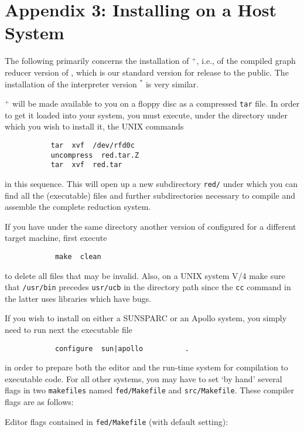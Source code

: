 \section*{Appendix 3: Installing \pired on a Host System}

The following primarily concerns the installation of \pired$^+$, i.e., of the
 compiled graph reducer version of \pired, which is our standard version for
release to the public. The installation of the interpreter
 version \pired$^*$ is very similar.

\pired$^+$ will be made available to you on a floppy disc as a compressed
 {\tt tar} file. In order to get it loaded into your system, you must
execute, under the directory under which you wish to install it, the
UNIX commands 
\begin{verbatim}
           tar  xvf  /dev/rfd0c 
           uncompress  red.tar.Z 
           tar  xvf  red.tar
\end{verbatim}
in this sequence. This will open up a new subdirectory {\tt red/} under
 which you can find all the (executable) files and further subdirectories 
necessary to compile and assemble the complete reduction system. 

If you have under the same directory another version of \pired configured for a
different target machine, first execute
\begin{verbatim}
            make  clean
\end{verbatim}
to delete all files that may be invalid. Also, on a UNIX system V/4 
make sure that {\tt /usr/bin} precedes  {\tt usr/ucb} in the directory path
since the {\tt cc} command in the latter uses libraries which have bugs.

If you wish to install \pired on either a SUNSPARC or an Apollo system,
you simply need to run next the executable file 
\begin{verbatim}
            configure  sun|apollo          .
\end{verbatim}
in order to prepare both the editor and the run-time system 
 for compilation to executable code.
For all other systems, you may have to set `by hand' several flags in two
{\tt makefiles} named {\tt fed/Makefile} and {\tt src/Makefile}. These
compiler flags are as follows:

\vspace{5mm}

\noindent Editor flags contained in {\tt fed/Makefile} (with default setting):
 
